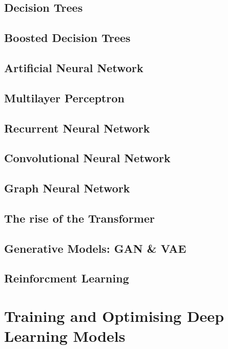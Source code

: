 \subsection{Decision Trees}

\subsection{Boosted Decision Trees}

\subsection{Artificial Neural Network}

\subsection{Multilayer Perceptron}

\subsection{Recurrent Neural Network}

\subsection{Convolutional Neural Network}

\subsection{Graph Neural Network}

\subsection{The rise of the Transformer}

\subsection{Generative Models: GAN \& VAE}

\subsection{Reinforcment Learning}

\section{Training and Optimising Deep Learning Models}

